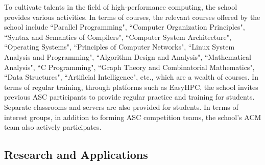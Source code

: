To cultivate talents in the field of high-performance computing, the school provides various activities.
In terms of courses, the relevant courses offered by the school include ``Parallel Programming", ``Computer Organization Principles", ``Syntax and Semantics of Compilers", ``Computer System Architecture", ``Operating Systems", ``Principles of Computer Networks", ``Linux System Analysis and Programming", ``Algorithm Design and Analysis", ``Mathematical Analysis", ``C Programming", ``Graph Theory and Combinatorial Mathematics", ``Data Structures", ``Artificial Intelligence", etc., which are a wealth of courses.
In terms of regular training, through platforms such as EasyHPC, the school invites previous ASC participants to provide regular practice and training for students. 
Separate classrooms and servers are also provided for students.
In terms of interest groups, in addition to forming ASC competition teams, the school's ACM team also actively participates.

\subsection{Research and Applications}
\ 






